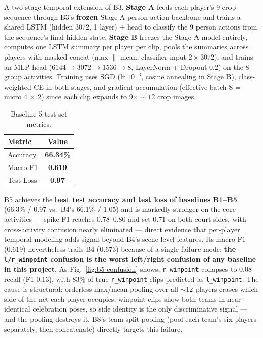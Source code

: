 \documentclass[9pt,a4paper,twocolumn,twoside]{tau-class/tau}
\begin{document}
A two-stage temporal extension of B3. \textbf{Stage A} feeds each player's 9-crop sequence through B3's \textbf{frozen} Stage-A person-action backbone and trains a shared LSTM (hidden 3072, 1 layer) + head to classify the 9 person actions from the sequence's final hidden state. \textbf{Stage B} freezes the Stage-A model entirely, computes one LSTM summary per player per clip, pools the summaries across players with masked concat (max $\|$ mean, classifier input $2 \times 3072$), and trains an MLP head ($6144 \to 3072 \to 1536 \to 8$, LayerNorm + Dropout 0.2) on the 8 group activities. Training uses SGD (lr $10^{-3}$, cosine annealing in Stage B), class-weighted CE in both stages, and gradient accumulation (effective batch 8 = micro 4 $\times$ 2) since each clip expands to $9 \times {\sim}12$ crop images.

\begin{table}[h]
    \centering
    \caption{Baseline 5 test-set metrics.}
    \label{tab:b5-metrics}
    \begin{tabular}{lc}
        \toprule
        \textbf{Metric} & \textbf{Value} \\
        \midrule
        Accuracy   & \textbf{66.34\%} \\
        Macro F1   & \textbf{0.619} \\
        Test Loss  & \textbf{0.97} \\
        \bottomrule
    \end{tabular}
\end{table}

B5 achieves the \textbf{best test accuracy and test loss of baselines B1--B5} (66.3\% / 0.97 vs.\ B4's 66.1\% / 1.05) and is markedly stronger on the core activities --- spike F1 reaches 0.78--0.80 and set 0.71 on both court sides, with cross-activity confusion nearly eliminated --- direct evidence that per-player temporal modeling adds signal beyond B4's scene-level features. Its macro F1 (0.619) nevertheless trails B4 (0.673) because of a single failure mode: \textbf{the \texttt{l/r\_winpoint} confusion is the worst left/right confusion of any baseline in this project}. As Fig.~\ref{fig:b5-confusion} shows, \texttt{r\_winpoint} collapses to 0.08 recall (F1 0.13), with 83\% of true \texttt{r\_winpoint} clips predicted as \texttt{l\_winpoint}. The cause is structural: orderless max/mean pooling over all ${\sim}12$ players erases which side of the net each player occupies; winpoint clips show both teams in near-identical celebration poses, so side identity is the only discriminative signal --- and the pooling destroys it. B8's team-split pooling (pool each team's six players separately, then concatenate) directly targets this failure.
\end{document}
